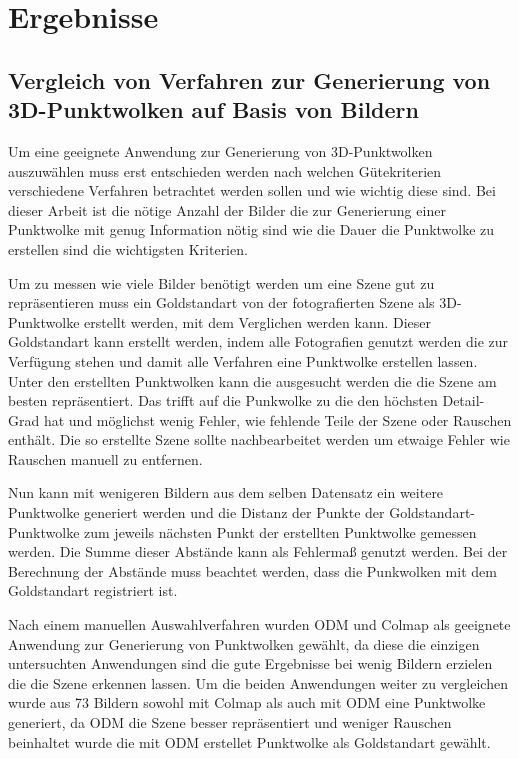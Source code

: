 \documentclass[12pt,titlepage, twoside]{article}
\begin{document}
\newpage
\section{Ergebnisse}
\label{sec:ergebnisse}
%

\subsection{Vergleich von Verfahren zur Generierung von 3D-Punktwolken auf Basis von Bildern}

Um eine geeignete Anwendung zur Generierung von 3D-Punktwolken auszuwählen muss erst entschieden werden nach welchen Gütekriterien verschiedene Verfahren betrachtet werden sollen und wie wichtig diese sind.
Bei dieser Arbeit ist die nötige Anzahl der Bilder die zur Generierung einer Punktwolke mit genug Information nötig sind wie die Dauer die Punktwolke zu erstellen sind die wichtigsten Kriterien.

Um zu messen wie viele Bilder benötigt werden um eine Szene gut zu repräsentieren muss ein Goldstandart von der fotografierten Szene als 3D-Punktwolke erstellt werden, mit dem Verglichen werden kann.
Dieser Goldstandart kann erstellt werden, indem alle Fotografien genutzt werden die zur Verfügung stehen und damit alle Verfahren eine Punktwolke erstellen lassen. 
Unter den erstellten Punktwolken kann die ausgesucht werden die die Szene am besten repräsentiert. 
Das trifft auf die Punkwolke zu die den höchsten Detail-Grad hat und möglichst wenig Fehler, wie fehlende Teile der Szene oder Rauschen enthält.
Die so erstellte Szene sollte nachbearbeitet werden um etwaige Fehler wie Rauschen manuell zu entfernen.

Nun kann mit wenigeren Bildern aus dem selben Datensatz ein weitere Punktwolke generiert werden und die Distanz der Punkte der Goldstandart-Punktwolke zum jeweils nächsten Punkt der erstellten Punktwolke gemessen werden.
Die Summe dieser Abstände kann als Fehlermaß genutzt werden. Bei der Berechnung der Abstände muss beachtet werden, dass die Punkwolken mit dem Goldstandart registriert ist.

Nach einem manuellen Auswahlverfahren wurden ODM und Colmap als geeignete Anwendung zur Generierung von Punktwolken gewählt, da diese die einzigen untersuchten Anwendungen sind die gute Ergebnisse bei wenig Bildern erzielen die die Szene erkennen lassen.
Um die beiden Anwendungen weiter zu vergleichen wurde aus 73 Bildern sowohl mit Colmap als auch mit ODM eine Punktwolke generiert, 
da ODM die Szene besser repräsentiert und weniger Rauschen beinhaltet wurde die mit ODM erstellet Punktwolke als Goldstandart gewählt. 
\end{document}
